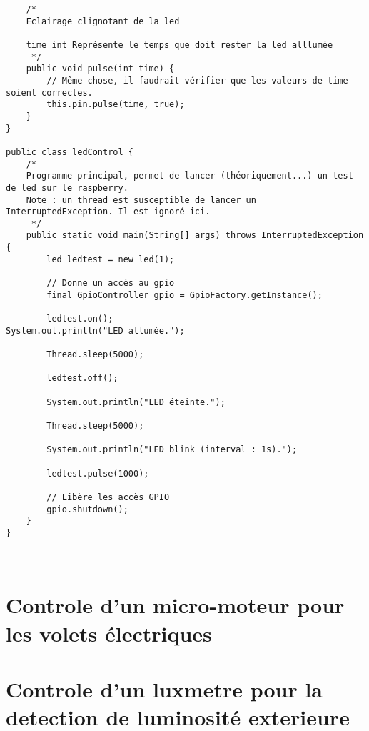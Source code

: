 \documentclass{article}
\newenvironment{DDbox}[1]{
\begin{lrbox}{\BBbox}\begin{minipage}{\linewidth}}
{\end{minipage}\end{lrbox}\noindent\colorbox{Zgris}{\usebox{\BBbox}} \\
[.5cm]}
\begin{document}
\begin{DDbox}{\linewidth}
\begin{lstlisting}
    /*
    Eclairage clignotant de la led

    time int Représente le temps que doit rester la led alllumée
     */
    public void pulse(int time) {
        // Même chose, il faudrait vérifier que les valeurs de time soient correctes.
        this.pin.pulse(time, true);
    }
}

public class ledControl {
    /*
    Programme principal, permet de lancer (théoriquement...) un test de led sur le raspberry.
    Note : un thread est susceptible de lancer un InterruptedException. Il est ignoré ici.
     */
    public static void main(String[] args) throws InterruptedException {
        led ledtest = new led(1);

        // Donne un accès au gpio
        final GpioController gpio = GpioFactory.getInstance();

        ledtest.on();
System.out.println("LED allumée.");

        Thread.sleep(5000);

        ledtest.off();

        System.out.println("LED éteinte.");

        Thread.sleep(5000);

        System.out.println("LED blink (interval : 1s).");

        ledtest.pulse(1000);

        // Libère les accès GPIO
        gpio.shutdown();
    }
}
\end{lstlisting}
\end{DDbox}
\section*{Controle d'un micro-moteur pour les volets électriques}

\section*{Controle d'un luxmetre pour la detection de luminosité exterieure}
\end{document}
